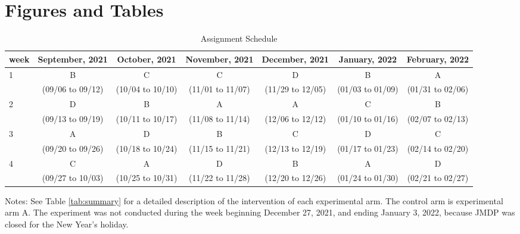 \documentclass [12pt, a4paper]{article}
\renewcommand{\thesection}{\Roman{section}.}
\begin{document}
\setcounter{figure}{0}
\setcounter{table}{0}
\renewcommand\thefigure{\thesection\arabic{figure}}
\renewcommand{\thetable}{\thesection\arabic{table}}
\renewcommand{\theHfigure}{\thesection\arabic{figure}}
\renewcommand{\theHtable}{\thesection\arabic{table}}

\hypertarget{figtab}{%
\section{Figures and Tables}\label{figtab}}

\begin{table}[H]

\caption{\label{tab:assignment}Assignment Schedule}
\centering
\fontsize{9}{11}\selectfont
\begin{threeparttable}
\begin{tabular}[t]{lcccccc}
\toprule
week & September, 2021 & October, 2021 & November, 2021 & December, 2021 & January, 2022 & February, 2022\\
\midrule
1 & B & C & C & D & B & A\\
 & (09/06 to 09/12) & (10/04 to 10/10) & (11/01 to 11/07) & (11/29 to 12/05) & (01/03 to 01/09) & (01/31 to 02/06)\\
2 & D & B & A & A & C & B\\
 & (09/13 to 09/19) & (10/11 to 10/17) & (11/08 to 11/14) & (12/06 to 12/12) & (01/10 to 01/16) & (02/07 to 02/13)\\
3 & A & D & B & C & D & C\\
 & (09/20 to 09/26) & (10/18 to 10/24) & (11/15 to 11/21) & (12/13 to 12/19) & (01/17 to 01/23) & (02/14 to 02/20)\\
4 & C & A & D & B & A & D\\
 & (09/27 to 10/03) & (10/25 to 10/31) & (11/22 to 11/28) & (12/20 to 12/26) & (01/24 to 01/30) & (02/21 to 02/27)\\
\bottomrule
\end{tabular}
\begin{tablenotes}
\item Notes: See Table \ref{tab:summary} for a detailed description of the intervention of each experimental arm. The control arm is experimental arm A. The experiment was not conducted during the week beginning December 27, 2021, and ending January 3, 2022, because JMDP was closed for the New Year's holiday.
\end{tablenotes}
\end{threeparttable}
\end{table}
\end{document}
